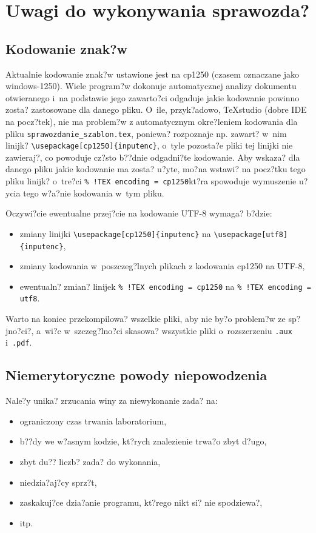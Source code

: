 \newlength\fwidth
\newlength\fheight

\chapter{Uwagi do wykonywania sprawozda?}
\section{Kodowanie znak?w}
Aktualnie kodowanie znak?w ustawione jest na cp1250 (czasem oznaczane jako windows-1250). Wiele program?w dokonuje automatycznej analizy dokumentu otwieranego i~na podstawie jego zawarto?ci odgaduje jakie kodowanie powinno zosta? zastosowane dla danego pliku. O~ile, przyk?adowo, TeXstudio (dobre IDE na pocz?tek), nie ma problem?w z automatycznym okre?leniem kodowania dla pliku \verb|sprawozdanie_szablon.tex|, poniewa? rozpoznaje np. zawart? w~nim linijk? \verb|\usepackage[cp1250]{inputenc}|, o~tyle pozosta?e pliki tej linijki nie zawieraj?, co powoduje cz?sto b??dnie odgadni?te kodowanie. Aby wskaza? dla danego pliku jakie kodowanie ma zosta? u?yte, mo?na wstawi? na pocz?tku tego pliku linijk? o~tre?ci \newline\verb|% !TEX encoding = cp1250|\newline kt?ra spowoduje wymuszenie u?ycia tego w?a?nie kodowania w~tym pliku.

Oczywi?cie ewentualne przej?cie na kodowanie UTF-8 wymaga? b?dzie:
\begin{itemize}
	\item zmiany linijki \verb|\usepackage[cp1250]{inputenc}| na \verb|\usepackage[utf8]{inputenc}|,
	\item zmiany kodowania w~poszczeg?lnych plikach z kodowania cp1250 na UTF-8,
	\item ewentualn? zmian? linijek \verb|% !TEX encoding = cp1250| na \verb|% !TEX encoding = utf8|.
\end{itemize}
Warto na koniec przekompilowa? wszelkie pliki, aby nie by?o problem?w ze sp?jno?ci?, a~wi?c w~szczeg?lno?ci skasowa? wszystkie pliki o~rozszerzeniu \verb|.aux| i~\verb|.pdf|.

\section{Niemerytoryczne powody niepowodzenia}
Nale?y unika? zrzucania winy za niewykonanie zada? na:
\begin{itemize}
	\item ograniczony czas trwania laboratorium,
	\item b??dy we w?asnym kodzie, kt?rych znalezienie trwa?o zbyt d?ugo,
	\item zbyt du?? liczb? zada? do wykonania,
	\item niedzia?aj?cy sprz?t,
	\item zaskakuj?ce dzia?anie programu, kt?rego nikt si? nie spodziewa?,
	\item itp.
\end{itemize} 

